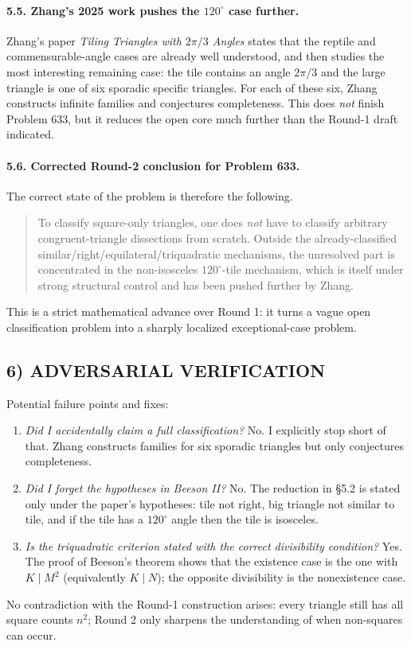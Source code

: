 \paragraph{5.5. Zhang's 2025 work pushes the $120^\circ$ case further.}
Zhang's paper \emph{Tiling Triangles with $2\pi/3$ Angles} states that the reptile and commensurable-angle cases are already well understood, and then studies the most interesting remaining case: the tile contains an angle $2\pi/3$ and the large triangle is one of six sporadic specific triangles. For each of these six, Zhang constructs infinite families and conjectures completeness. This does \emph{not} finish Problem 633, but it reduces the open core much further than the Round-1 draft indicated.

\paragraph{5.6. Corrected Round-2 conclusion for Problem 633.}
The correct state of the problem is therefore the following.
\begin{quote}
To classify square-only triangles, one does \emph{not} have to classify arbitrary congruent-triangle dissections from scratch. Outside the already-classified similar/right/equilateral/triquadratic mechanisms, the unresolved part is concentrated in the non-isosceles $120^\circ$-tile mechanism, which is itself under strong structural control and has been pushed further by Zhang.
\end{quote}
This is a strict mathematical advance over Round 1: it turns a vague open classification problem into a sharply localized exceptional-case problem.

\subsection*{6) ADVERSARIAL VERIFICATION}
Potential failure points and fixes:
\begin{enumerate}
\item \emph{Did I accidentally claim a full classification?} No. I explicitly stop short of that. Zhang constructs families for six sporadic triangles but only conjectures completeness.
\item \emph{Did I forget the hypotheses in Beeson II?} No. The reduction in \S5.2 is stated only under the paper's hypotheses: tile not right, big triangle not similar to tile, and if the tile has a $120^\circ$ angle then the tile is isosceles.
\item \emph{Is the triquadratic criterion stated with the correct divisibility condition?} Yes. The proof of Beeson's theorem shows that the existence case is the one with $K\mid M^2$ (equivalently $K\mid N$); the opposite divisibility is the nonexistence case.
\end{enumerate}
No contradiction with the Round-1 construction arises: every triangle still has all square counts $n^2$; Round 2 only sharpens the understanding of when non-squares can occur.

